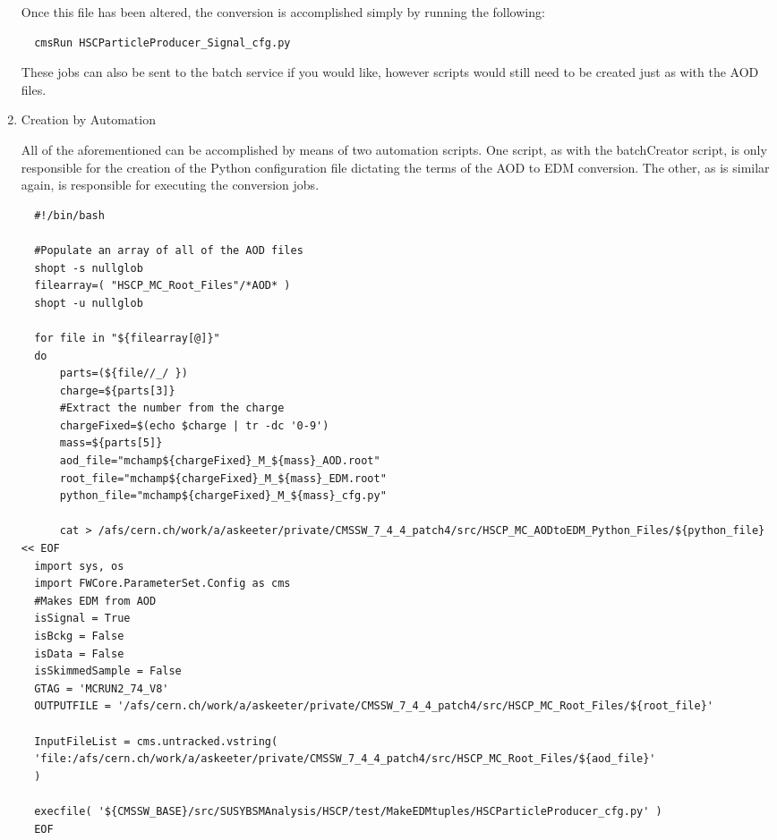 \documentclass[11 pt , letterpaper , twoside , openright]{book}
\begin{document}
\begin{enumerate}
Once this file has been altered, the conversion is accomplished
simply by running the following:

\lstset{language=sh,label= ,caption= ,numbers=none}
\begin{lstlisting}
  cmsRun HSCParticleProducer_Signal_cfg.py
\end{lstlisting}

These jobs can also be sent to the batch service if you would
like, however scripts would still need to be created just as with
the AOD files.

\item Creation by Automation
\label{sec-1-1-3-2}

All of the aforementioned can be accomplished by means of two
automation scripts. One script, as with the batchCreator script,
is only responsible for the creation of the Python configuration
file dictating the terms of the AOD to EDM conversion. The other,
as is similar again, is responsible for executing the conversion
jobs.

\lstset{language=sh,label=aod-to-edm-creator,caption= ,numbers=none}
\begin{lstlisting}
  #!/bin/bash

  #Populate an array of all of the AOD files
  shopt -s nullglob
  filearray=( "HSCP_MC_Root_Files"/*AOD* )
  shopt -u nullglob

  for file in "${filearray[@]}"
  do
      parts=(${file//_/ })
      charge=${parts[3]}
      #Extract the number from the charge
      chargeFixed=$(echo $charge | tr -dc '0-9')
      mass=${parts[5]}    
      aod_file="mchamp${chargeFixed}_M_${mass}_AOD.root"
      root_file="mchamp${chargeFixed}_M_${mass}_EDM.root"
      python_file="mchamp${chargeFixed}_M_${mass}_cfg.py"

      cat > /afs/cern.ch/work/a/askeeter/private/CMSSW_7_4_4_patch4/src/HSCP_MC_AODtoEDM_Python_Files/${python_file} << EOF
  import sys, os
  import FWCore.ParameterSet.Config as cms
  #Makes EDM from AOD
  isSignal = True
  isBckg = False
  isData = False
  isSkimmedSample = False
  GTAG = 'MCRUN2_74_V8'
  OUTPUTFILE = '/afs/cern.ch/work/a/askeeter/private/CMSSW_7_4_4_patch4/src/HSCP_MC_Root_Files/${root_file}'

  InputFileList = cms.untracked.vstring(
  'file:/afs/cern.ch/work/a/askeeter/private/CMSSW_7_4_4_patch4/src/HSCP_MC_Root_Files/${aod_file}'
  )

  execfile( '${CMSSW_BASE}/src/SUSYBSMAnalysis/HSCP/test/MakeEDMtuples/HSCParticleProducer_cfg.py' )
  EOF


\end{lstlisting}
\end{enumerate}
\end{document}

